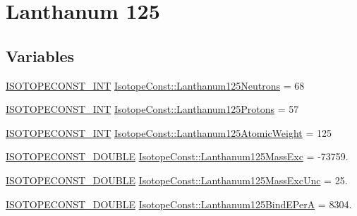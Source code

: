 \hypertarget{group___isotope_const-_lanthanum-_la125}{}\section{Lanthanum 125}
\label{group___isotope_const-_lanthanum-_la125}
\subsection*{Variables}
\begin{DoxyCompactItemize}
\item 
\mbox{\hyperlink{group___isotope_const-_macros_ga5f18360b3e99483a35c32d789e62621c}{I\+S\+O\+T\+O\+P\+E\+C\+O\+N\+S\+T\+\_\+\+I\+NT}} \mbox{\hyperlink{group___isotope_const-_lanthanum-_la125_gafd5535a90fab4444df54172f4a955a2a}{Isotope\+Const\+::\+Lanthanum125\+Neutrons}} = 68
\item 
\mbox{\hyperlink{group___isotope_const-_macros_ga5f18360b3e99483a35c32d789e62621c}{I\+S\+O\+T\+O\+P\+E\+C\+O\+N\+S\+T\+\_\+\+I\+NT}} \mbox{\hyperlink{group___isotope_const-_lanthanum-_la125_gaab6c719d5c6f11b38b64bc83c6f62087}{Isotope\+Const\+::\+Lanthanum125\+Protons}} = 57
\item 
\mbox{\hyperlink{group___isotope_const-_macros_ga5f18360b3e99483a35c32d789e62621c}{I\+S\+O\+T\+O\+P\+E\+C\+O\+N\+S\+T\+\_\+\+I\+NT}} \mbox{\hyperlink{group___isotope_const-_lanthanum-_la125_gaaacd1e858988d7830aee5fb45f396e09}{Isotope\+Const\+::\+Lanthanum125\+Atomic\+Weight}} = 125
\item 
\mbox{\hyperlink{group___isotope_const-_macros_ga8f45a7272ce02c0b4c65c44636ed719a}{I\+S\+O\+T\+O\+P\+E\+C\+O\+N\+S\+T\+\_\+\+D\+O\+U\+B\+LE}} \mbox{\hyperlink{group___isotope_const-_lanthanum-_la125_gaed6323da5be7b9bd49c731d5c9503386}{Isotope\+Const\+::\+Lanthanum125\+Mass\+Exc}} = -\/73759.
\item 
\mbox{\hyperlink{group___isotope_const-_macros_ga8f45a7272ce02c0b4c65c44636ed719a}{I\+S\+O\+T\+O\+P\+E\+C\+O\+N\+S\+T\+\_\+\+D\+O\+U\+B\+LE}} \mbox{\hyperlink{group___isotope_const-_lanthanum-_la125_ga0fa21ed1b9734268131ac36a0bcced41}{Isotope\+Const\+::\+Lanthanum125\+Mass\+Exc\+Unc}} = 25.
\item 
\mbox{\hyperlink{group___isotope_const-_macros_ga8f45a7272ce02c0b4c65c44636ed719a}{I\+S\+O\+T\+O\+P\+E\+C\+O\+N\+S\+T\+\_\+\+D\+O\+U\+B\+LE}} \mbox{\hyperlink{group___isotope_const-_lanthanum-_la125_gaa007c19e50b8d0cc7828b0916840bb9f}{Isotope\+Const\+::\+Lanthanum125\+Bind\+E\+PerA}} = 8304.
\item 

\end{DoxyCompactItemize}
